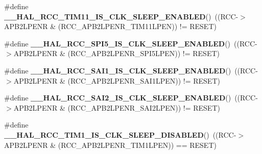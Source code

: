 \begin{DoxyCompactItemize}
\item 
\mbox{\label{group___r_c_c___clock___sleep___enable___disable___status_ga4eb8d9a7dcfdba9b830f54c0f19c87c4}} 
\#define {\bfseries \+\_\+\+\_\+\+H\+A\+L\+\_\+\+R\+C\+C\+\_\+\+T\+I\+M11\+\_\+\+I\+S\+\_\+\+C\+L\+K\+\_\+\+S\+L\+E\+E\+P\+\_\+\+E\+N\+A\+B\+L\+ED}()~((R\+CC-\/$>$A\+P\+B2\+L\+P\+E\+NR \& (R\+C\+C\+\_\+\+A\+P\+B2\+L\+P\+E\+N\+R\+\_\+\+T\+I\+M11\+L\+P\+EN)) != R\+E\+S\+ET)
\item 
\mbox{\label{group___r_c_c___clock___sleep___enable___disable___status_ga25d02f053a40bef81c45562486cbaf8d}} 
\#define {\bfseries \+\_\+\+\_\+\+H\+A\+L\+\_\+\+R\+C\+C\+\_\+\+S\+P\+I5\+\_\+\+I\+S\+\_\+\+C\+L\+K\+\_\+\+S\+L\+E\+E\+P\+\_\+\+E\+N\+A\+B\+L\+ED}()~((R\+CC-\/$>$A\+P\+B2\+L\+P\+E\+NR \& (R\+C\+C\+\_\+\+A\+P\+B2\+L\+P\+E\+N\+R\+\_\+\+S\+P\+I5\+L\+P\+EN)) != R\+E\+S\+ET)
\item 
\mbox{\label{group___r_c_c___clock___sleep___enable___disable___status_ga9104ce5c4edc990dbea591e10e221d76}} 
\#define {\bfseries \+\_\+\+\_\+\+H\+A\+L\+\_\+\+R\+C\+C\+\_\+\+S\+A\+I1\+\_\+\+I\+S\+\_\+\+C\+L\+K\+\_\+\+S\+L\+E\+E\+P\+\_\+\+E\+N\+A\+B\+L\+ED}()~((R\+CC-\/$>$A\+P\+B2\+L\+P\+E\+NR \& (R\+C\+C\+\_\+\+A\+P\+B2\+L\+P\+E\+N\+R\+\_\+\+S\+A\+I1\+L\+P\+EN)) != R\+E\+S\+ET)
\item 
\mbox{\label{group___r_c_c___clock___sleep___enable___disable___status_ga00caa3045e1ac7a34706a44ba4a1c65b}} 
\#define {\bfseries \+\_\+\+\_\+\+H\+A\+L\+\_\+\+R\+C\+C\+\_\+\+S\+A\+I2\+\_\+\+I\+S\+\_\+\+C\+L\+K\+\_\+\+S\+L\+E\+E\+P\+\_\+\+E\+N\+A\+B\+L\+ED}()~((R\+CC-\/$>$A\+P\+B2\+L\+P\+E\+NR \& (R\+C\+C\+\_\+\+A\+P\+B2\+L\+P\+E\+N\+R\+\_\+\+S\+A\+I2\+L\+P\+EN)) != R\+E\+S\+ET)
\item 
\mbox{\label{group___r_c_c___clock___sleep___enable___disable___status_ga78a957797ebffd3e539bb4c833c29a3d}} 
\#define {\bfseries \+\_\+\+\_\+\+H\+A\+L\+\_\+\+R\+C\+C\+\_\+\+T\+I\+M1\+\_\+\+I\+S\+\_\+\+C\+L\+K\+\_\+\+S\+L\+E\+E\+P\+\_\+\+D\+I\+S\+A\+B\+L\+ED}()~((R\+CC-\/$>$A\+P\+B2\+L\+P\+E\+NR \& (R\+C\+C\+\_\+\+A\+P\+B2\+L\+P\+E\+N\+R\+\_\+\+T\+I\+M1\+L\+P\+EN)) == R\+E\+S\+ET)

\end{DoxyCompactItemize}
